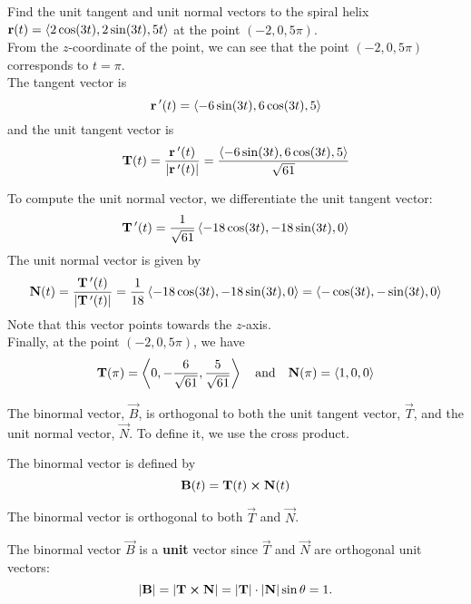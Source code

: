 \documentclass[handout]{ximera}
\begin{document}
\begin{example}[example 1]
Find the unit tangent and unit normal vectors to the spiral helix $\mathbf r(t) =  \left\langle 2\cos(3t), 2\sin(3t), 5t\right\rangle$ at the point $(-2, 0, 5\pi)$.\\
From the $z$-coordinate of the point, we can see that the point $(-2, 0, 5\pi)$ corresponds to $t = \pi$.\\
The tangent vector is
\[
\mathbf r \,'(t) = \left\langle -6 \sin(3t), 6\cos(3t), 5\right\rangle
\]
and the unit tangent vector is
\[
\mathbf T(t) = \frac{\mathbf r\,'(t)}{|\mathbf r\,'(t)|} = \frac{\left\langle -6 \sin(3t), 6\cos(3t), 5\right\rangle}{\sqrt{61}}
\]

To compute the unit normal vector, we differentiate the unit tangent vector:
\[
\mathbf T\,'(t) = \frac{1}{\sqrt{61}} \left\langle -18 \cos(3t), -18 \sin(3t), 0\right\rangle
\]
The unit normal vector is given by
\[
\mathbf N(t) = \frac{\mathbf T\,'(t)}{|\mathbf T\,'(t)|} = \frac{1}{18} \left\langle -18 \cos(3t), -18 \sin(3t), 0\right\rangle = \left\langle -\cos(3t), -\sin(3t), 0\right\rangle
\]
Note that this vector points towards the $z$-axis.\\
Finally, at the point $(-2, 0, 5\pi)$, we have
\[
\mathbf T(\pi) = \left\langle 0, -\frac{6}{\sqrt{61}}, \frac{5}{\sqrt{61}}\right\rangle \quad \text{and} \quad \mathbf N(\pi) = \left\langle 1, 0, 0\right\rangle
\]
\end{example}

The binormal vector, $\vec B$, is orthogonal to both the unit tangent vector, $\vec T$, and the unit normal vector, $\vec N$. To define it, we use the cross product.

\begin{definition}
The binormal vector is defined by
\[
\mathbf B(t) = \mathbf T(t) \boldsymbol\times \mathbf N(t)
\]
\end{definition}

\begin{remark}
The binormal vector is orthogonal to both $\vec T$ and $\vec N$. 
\end{remark}

\begin{remark}
The binormal vector $\vec B$ is a \textbf{unit} vector since $\vec T$ and $\vec N$ are orthogonal unit vectors:
\[
|\mathbf B| = |\mathbf T \boldsymbol\times \mathbf N| = |\mathbf T| \cdot |\mathbf N| \sin \theta = 1.
\]
\end{remark}
\end{document}
